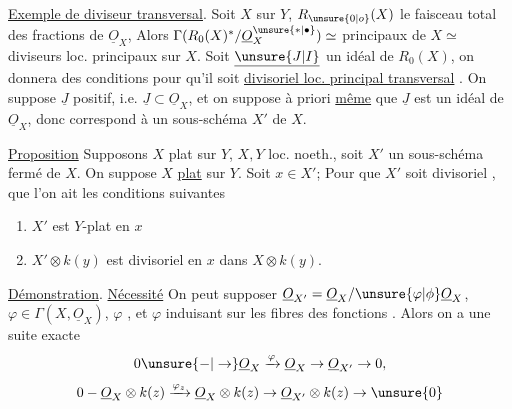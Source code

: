 \uline{Exemple de diviseur transversal}. Soit $X$  sur $Y$,  $R_{\unsure{0|o}}(X)$ le faisceau total des fractions de $\underline{O}_X$,  Alors $\Gamma(R_0(X)^*/\underline{O}_X^{\unsure{*|\bullet}})\simeq$      principaux de $X\simeq$ diviseurs loc. principaux sur $X$. Soit $\underline{\unsure{J|I}}$ un idéal de $R_0(X)$, on donnera des conditions pour qu'il soit  \uline{divisoriel loc. principal transversal} \deleted{$\unsure{\xi}$}. On suppose $\underline{J}$ positif, i.e. $\underline{J}\subset\underline{O}_X$, et on suppose à priori \uline{même} que $\underline{J}$ est un idéal de $\underline{O}_X$, \deleted{$\unsure{\xi}$} donc correspond à un sous-schéma $X'$ de $X$.

\uline{Proposition} Supposons $X$ plat sur $Y$, $X,Y$ loc. noeth., soit $X'$ un sous-schéma fermé de $X$. On suppose $X$ \uline{plat} sur $Y$. Soit $x\in X'$;  Pour que $X'$ soit divisoriel  ,  que l'on ait les conditions suivantes

\begin{enumerate}[label=(\roman*)]
\item $X'$ est $Y$-plat en $x$
\item $X'\otimes k(y)$ est divisoriel  en $x$ dans $X\otimes k(y)$.
\end{enumerate}

\uline{Démonstration}. \uline{Nécessité} On peut supposer $\underline{O}_{X'}=\underline{O}_X/\unsure{\varphi|\phi}\underline{O}_X$, $\varphi\in\Gamma(X,\underline{O}_X)$, $\varphi$    \uline{}, et $\varphi$ induisant sur les fibres des fonctions . Alors on a une suite exacte
\[
0\unsure{-|\to}\underline{O}_X\xrightarrow{\varphi}\underline{O}_X\to\underline{O}_{X'}\to0,
\]
  
\[
0-\underline{O}_X\otimes k(z)\xrightarrow{\varphi_z}\underline{O}_X\otimes k(z)\to\underline{O}_{X'}\otimes k(z)\to\unsure{0}
\]

